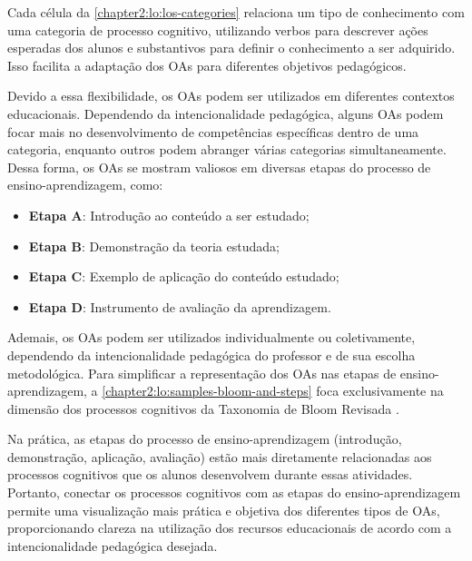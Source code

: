 Cada célula da \autoref{chapter2:lo:los-categories} relaciona um tipo de conhecimento com uma categoria de processo cognitivo, utilizando verbos para descrever ações esperadas dos alunos e substantivos para definir o conhecimento a ser adquirido. Isso facilita a adaptação dos OAs para diferentes objetivos pedagógicos.

Devido a essa flexibilidade, os OAs podem ser utilizados em diferentes contextos educacionais. Dependendo da intencionalidade pedagógica, alguns OAs podem focar mais no desenvolvimento de competências específicas dentro de uma categoria, enquanto outros podem abranger várias categorias simultaneamente. Dessa forma, os OAs se mostram valiosos em diversas etapas do processo de ensino-aprendizagem, como:

\begin{itemize}
\item \textbf{Etapa A}: Introdução ao conteúdo a ser estudado;
\item \textbf{Etapa B}: Demonstração da teoria estudada;
\item \textbf{Etapa C}: Exemplo de aplicação do conteúdo estudado;
\item \textbf{Etapa D}: Instrumento de avaliação da aprendizagem.
\end{itemize}

Ademais, os OAs podem ser utilizados individualmente ou coletivamente, dependendo da intencionalidade pedagógica do professor e de sua escolha metodológica. Para simplificar a representação dos OAs nas etapas de ensino-aprendizagem, a \autoref{chapter2:lo:samples-bloom-and-steps} foca exclusivamente na dimensão dos processos cognitivos da Taxonomia de Bloom Revisada \cite{Krathwohl2002}. 

Na prática, as etapas do processo de ensino-aprendizagem (introdução, demonstração, aplicação, avaliação) estão mais diretamente relacionadas aos processos cognitivos que os alunos desenvolvem durante essas atividades. Portanto, conectar os processos cognitivos com as etapas do ensino-aprendizagem permite uma visualização mais prática e objetiva dos diferentes tipos de OAs, proporcionando clareza na utilização dos recursos educacionais de acordo com a intencionalidade pedagógica desejada.

